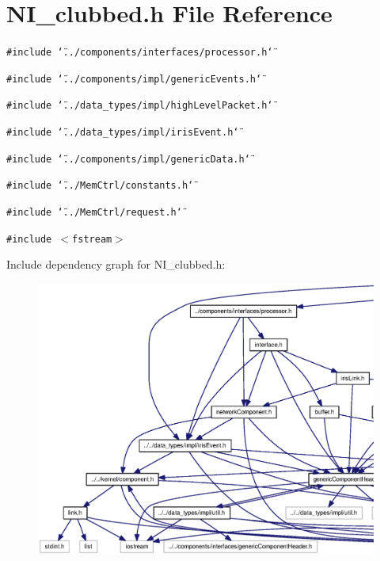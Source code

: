 \section{NI\_\-clubbed.h File Reference}
\label{NI__clubbed_8h}
{\tt \#include \char`\"{}../components/interfaces/processor.h\char`\"{}}\par
{\tt \#include \char`\"{}../components/impl/genericEvents.h\char`\"{}}\par
{\tt \#include \char`\"{}../data\_\-types/impl/highLevelPacket.h\char`\"{}}\par
{\tt \#include \char`\"{}../data\_\-types/impl/irisEvent.h\char`\"{}}\par
{\tt \#include \char`\"{}../components/impl/genericData.h\char`\"{}}\par
{\tt \#include \char`\"{}../MemCtrl/constants.h\char`\"{}}\par
{\tt \#include \char`\"{}../MemCtrl/request.h\char`\"{}}\par
{\tt \#include $<$fstream$>$}\par


Include dependency graph for NI\_\-clubbed.h:\nopagebreak
\begin{figure}[H]
\begin{center}
\leavevmode
\includegraphics[width=420pt]{NI__clubbed_8h__incl}
\end{center}
\end{figure}


